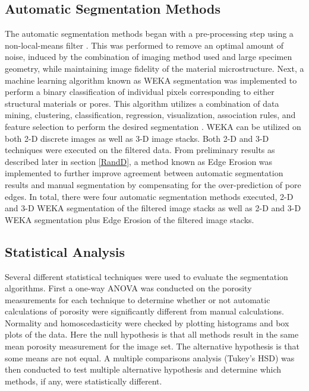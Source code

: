 \documentclass[11pt, twocolumn]{IEEEtran}
\begin{document}
\subsection{Automatic Segmentation Methods}
The automatic segmentation methods began with a pre-processing step using a non-local-means filter \cite{buades2011non}. This was performed to remove an optimal amount of noise, induced by the combination of imaging method used and large specimen geometry, while maintaining image fidelity of the material microstructure. Next, a machine learning algorithm known as WEKA segmentation was implemented to perform a binary classification of individual pixels corresponding to either structural materials or pores. This algorithm utilizes a combination of data mining, clustering, classification, regression, visualization, association rules, and feature selection to perform the desired segmentation \cite{Weka}. WEKA can be utilized on both 2-D discrete images as well as 3-D image stacks. Both 2-D and 3-D techniques were executed on the filtered data. From preliminary results as described later in section \ref{RandD}, a method known as Edge Erosion was implemented to further improve agreement between automatic segmentation results and manual segmentation by compensating for the over-prediction of pore edges. In total, there were four automatic segmentation methods executed, 2-D and 3-D WEKA segmentation of the filtered image stacks as well as 2-D and 3-D WEKA segmentation plus Edge Erosion of the filtered image stacks.

\subsection{Statistical Analysis} 
Several different statistical techniques were used to evaluate the segmentation algorithms. First a one-way ANOVA was conducted on the porosity measurements for each technique to determine whether or not automatic calculations of porosity were significantly different from manual calculations. Normality and homoscedasticity were checked by plotting histograms and box plots of the data. Here the null hypothesis is that all methods result in the same mean porosity measurement for the image set. The alternative hypothesis is that some means are not equal. A multiple comparisons analysis (Tukey's HSD) was then conducted to test multiple alternative hypothesis and determine which methods, if any, were statistically different.\\
\end{document}
